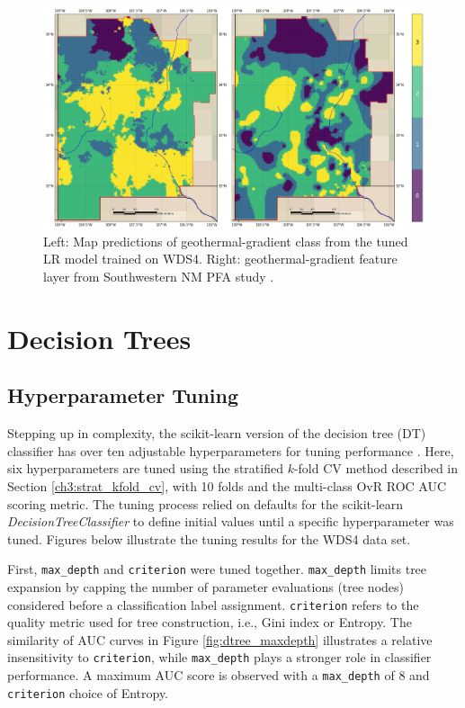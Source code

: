 \begin{figure}[!htp]
\centering
\includegraphics[width=\textwidth]{templates/images/Figure-LR-FinalMap_Joint.png}
\caption[Logistic regression prediction map]{Left: Map predictions of geothermal-gradient class from the tuned LR model trained on WDS4. Right: geothermal-gradient feature layer from Southwestern NM PFA study \protect\citep{bielicki_hydrogeolgic_2015}.}
\label{fig:logreg_final_map}
\end{figure}

\section{Decision Trees}\label{ch5:dtree_model}

\subsection{Hyperparameter Tuning}\label{ch5:dtree_tuning}

Stepping up in complexity, the scikit-learn version of the decision tree (DT) classifier has over ten adjustable hyperparameters for tuning performance \citep{pedregosa_scikit-learn_2011}. Here, six hyperparameters are tuned using the stratified $k$-fold CV method described in Section \ref{ch3:strat_kfold_cv}, with 10 folds and the multi-class OvR ROC AUC scoring metric. The tuning process relied on defaults for the scikit-learn \textit{DecisionTreeClassifier} to define initial values until a specific hyperparameter was tuned. Figures below illustrate the tuning results for the WDS4 data set.

First, \verb|max_depth| and \verb|criterion| were tuned together. \verb|max_depth| limits tree expansion by capping the number of parameter evaluations (tree nodes) considered before a classification label assignment. \verb|criterion| refers to the quality metric used for tree construction, i.e., Gini index or Entropy. The similarity of AUC curves in Figure \ref{fig:dtree_maxdepth} illustrates a relative insensitivity to \verb|criterion|, while \verb|max_depth| plays a stronger role in classifier performance. A maximum AUC score is observed with a \verb|max_depth| of 8 and \verb|criterion| choice of Entropy.

